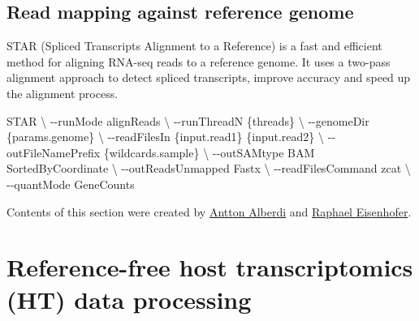 \documentclass[
]{book}
\newenvironment{Shaded}{\begin{snugshade}}{\end{snugshade}}
\newcommand{\AttributeTok}[1]{\textcolor[rgb]{0.77,0.63,0.00}{#1}}
\newcommand{\DataTypeTok}[1]{\textcolor[rgb]{0.13,0.29,0.53}{#1}}
\newcommand{\ExtensionTok}[1]{#1}
\newcommand{\NormalTok}[1]{#1}
\begin{document}
\normalsize

\hypertarget{read-mapping-against-reference-genome}{%
\subsection*{Read mapping against reference genome}\label{read-mapping-against-reference-genome}}

STAR (Spliced Transcripts Alignment to a Reference) is a fast and efficient method for aligning RNA-seq reads to a reference genome. It uses a two-pass alignment approach to detect spliced transcripts, improve accuracy and speed up the alignment process.

\small

\begin{Shaded}
\begin{Highlighting}[]
\ExtensionTok{STAR} \DataTypeTok{\textbackslash{}}
      \AttributeTok{{-}{-}runMode}\NormalTok{ alignReads }\DataTypeTok{\textbackslash{}}
      \AttributeTok{{-}{-}runThreadN}\NormalTok{ \{threads\} }\DataTypeTok{\textbackslash{}}
      \AttributeTok{{-}{-}genomeDir}\NormalTok{ \{params.genome\} }\DataTypeTok{\textbackslash{}}
      \AttributeTok{{-}{-}readFilesIn}\NormalTok{ \{input.read1\} \{input.read2\} }\DataTypeTok{\textbackslash{}}
      \AttributeTok{{-}{-}outFileNamePrefix}\NormalTok{ \{wildcards.sample\} }\DataTypeTok{\textbackslash{}}
      \AttributeTok{{-}{-}outSAMtype}\NormalTok{ BAM SortedByCoordinate }\DataTypeTok{\textbackslash{}}
      \AttributeTok{{-}{-}outReadsUnmapped}\NormalTok{ Fastx }\DataTypeTok{\textbackslash{}}
      \AttributeTok{{-}{-}readFilesCommand}\NormalTok{ zcat }\DataTypeTok{\textbackslash{}}
      \AttributeTok{{-}{-}quantMode}\NormalTok{ GeneCounts}
\end{Highlighting}
\end{Shaded}

\normalsize

Contents of this section were created by \protect\hyperlink{antton-alberdi}{Antton Alberdi} and \protect\hyperlink{raphael-eisenhofer}{Raphael Eisenhofer}.

\hypertarget{host-transcriptomics-data-processing-reference-free}{%
\section{Reference-free host transcriptomics (HT) data processing}\label{host-transcriptomics-data-processing-reference-free}}
\end{document}
